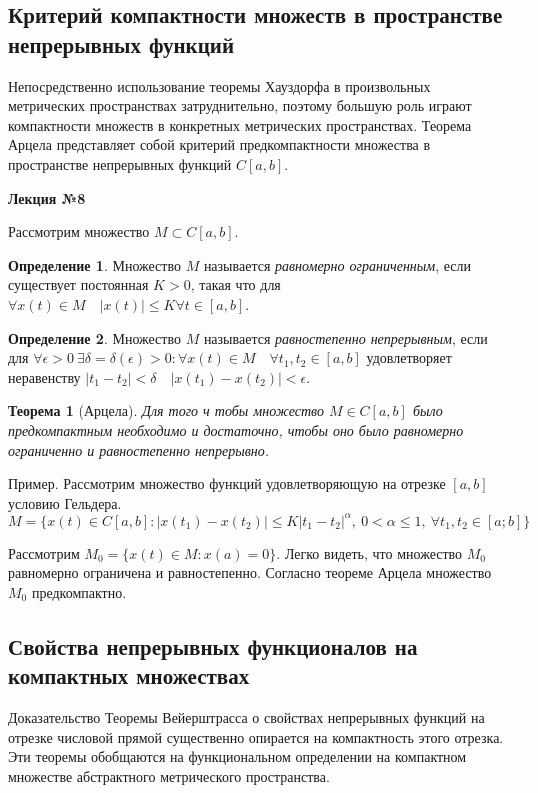 \documentclass[14pt,a4paper]{extarticle}
\newtheorem{theorem}{Теорема}[section]
\theoremstyle{definition}
\newtheorem{definition}{Определение}[section]
\theoremstyle{remark}
\renewcommand{\[}{\begin{dmath*}[compact]}
\renewcommand{\]}{\end{dmath*}}
\newcommand{\sep}{ , \ \allowbreak }
\begin{document}
\subsection{Критерий компактности множеств в пространстве непрерывных функций}

Непосредственно использование теоремы Хауздорфа в произвольных
метрических пространствах затруднительно, поэтому большую роль играют
компактности множеств в конкретных метрических пространствах.
Теорема Арцела представляет собой критерий предкомпактности множества
в пространстве непрерывных функций $C[a,b]$.

\textbf{Лекция №8}

Рассмотрим множество $M\subset C[a,b]$.

\begin{definition}
  Множество $M$ называется \textit{равномерно ограниченным},
  если существует постоянная $K>0$, такая что для
  $\forall x(t)\in M \quad |x(t)|\leq K \forall t \in [a,b]$.
\end{definition}

\begin{definition}
  Множество $M$ называется \textit{равностепенно непрерывным}, если для
  $\forall \epsilon > 0 \ \exists \delta = \delta(\epsilon)>0:
  \forall x(t)\in M\quad \forall t_1,t_2\in [a,b]$
  удовлетворяет неравенству $|t_1-t_2|<\delta \quad |x(t_1)-x(t_2)|<\epsilon$.
\end{definition}

\begin{theorem}[Арцела]
  Для того ч тобы множество $M\in C[a,b]$ было предкомпактным
  необходимо и достаточно, чтобы оно было равномерно ограниченно
  и равностепенно непрерывно.
\end{theorem}

Пример. Рассмотрим множество функций удовлетворяющую на отрезке $[a,b]$
условию Гельдера.
\[ M=\{x(t)\in C[a,b]: |x(t_1)-x(t_2)|\leq K|t_1-t_2|^\alpha \sep
0 < \alpha \leq 1 \sep \forall t_1,t_2 \in [a;b]\}\]

Рассмотрим $M_0=\{x(t)\in M:x(a)=0\}$.
Легко видеть, что множество $M_0$ равномерно ограничена и равностепенно.
Согласно теореме Арцела множество $M_0$ предкомпактно.

\subsection{Свойства непрерывных функционалов на компактных множествах}

Доказательство Теоремы Вейерштрасса о свойствах непрерывных функций
на отрезке числовой прямой существенно опирается на компактность этого отрезка.
Эти теоремы обобщаются на функциональном определении на компактном
множестве абстрактного метрического пространства.
\end{document}
